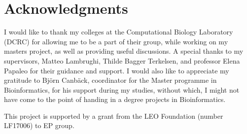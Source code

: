 \documentclass[10pt,letterpaper]{article}
\begin{document}
\section*{Acknowledgments}
I would like to thank my colleges at the Computational Biology Laboratory (DCRC) for allowing me to be a part of their group, while working on my masters project, as well as providing useful discussions. A special thanks to my supervisors, Matteo Lambrughi, Thilde Bagger Terkelsen, and professor Elena Papaleo for their guidance and support. I would also like to appreciate my gratitude to Björn Canbäck, coordinator for the Master programme in Bioinformatics, for his support during my studies, without which, I might not have come to the point of handing in a degree projects in Bioinformatics.

This project is supported by a grant from the LEO Foundation (number LF17006) to EP group.

\nolinenumbers



%  
\end{document}
